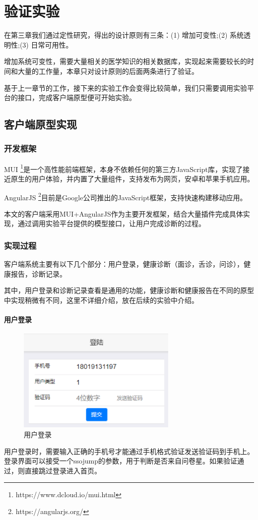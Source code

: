 \chapter{验证实验}

在第三章我们通过定性研究，得出的设计原则有三条：(1) 增加可变性;(2) 系统透明性;(3) 日常可用性。

增加系统可变性，需要大量相关的医学知识的相关数据库，实现起来需要较长的时间和大量的工作量，本章只对设计原则的后面两条进行了验证。

基于上一章节的工作，接下来的实验工作会变得比较简单，我们只需要调用实验平台的接口，完成客户端原型便可开始实验。


\section{客户端原型实现}

\subsection{开发框架}
MUI \footnote{https://www.dcloud.io/mui.html}是一个高性能前端框架，本身不依赖任何的第三方JavaScript库，实现了接近原生的用户体验，并内置了大量组件，支持发布为网页，安卓和苹果手机应用。

AngularJS \footnote{https://angularjs.org/}目前是Google公司推出的JavaScript框架，支持快速构建移动应用。

本文的客户端采用MUI+AngularJS作为主要开发框架，结合大量插件完成具体实现，通过调用实验平台提供的模型接口，让用户完成诊断的过程。

\subsection{实现过程}

客户端系统主要有以下几个部分：用户登录，健康诊断（面诊，舌诊，问诊），健康报告，诊断记录。

其中，用户登录和诊断记录查看是通用的功能，健康诊断和健康报告在不同的原型中实现稍微有不同，这里不详细介绍，放在后续的实验中介绍。


\subsubsection{用户登录}
\begin{figure}[ht]
    \centering
    \includegraphics[height=5cm]{images/login.png}
    \caption{用户登录}
    \label{fig:login}
\end{figure} 
用户登录时，需要输入正确的手机号才能通过手机格式验证发送验证码到手机上。登录界面可以接受一个ssojump的参数，用于判断是否来自问卷星。如果验证通过，则直接跳过登录进入首页。

